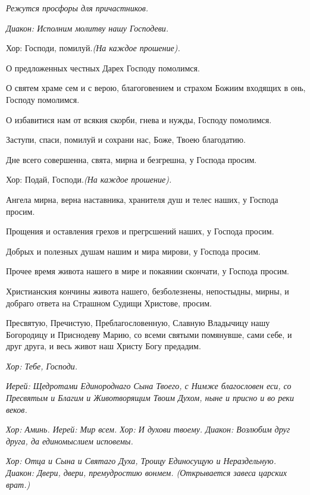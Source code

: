 \itshape  Режутся просфоры для причастников\normalfont{}. 




\itshape  Диакон:\normalfont{} Исполним молитву нашу Господеви. \itshape 


  Хор:\normalfont{} Господи, помилуй.\itshape  (На каждое прошение\normalfont{}). 


  О предложенных честных Дарех Господу помолимся. 


  О святем храме сем и с верою, благоговением и страхом Божиим входящих в онь, Господу помолимся. 


  О избавитися нам от всякия скорби, гнева и нужды, Господу помолимся. 


  Заступи, спаси, помилуй и сохрани нас, Боже, Твоею благодатию. 


  Дне всего совершенна, свята, мирна и безгрешна, у Господа просим. \itshape 


  Хор:\normalfont{} Подай, Господи.\itshape  (На каждое прошение)\normalfont{}. 


  Ангела мирна, верна наставника, хранителя душ и телес наших, у Господа просим. 


  Прощения и оставления грехов и прегрсшений наших, у Господа просим. 


  Добрых и полезных душам нашим и мира мирови, у Господа просим. 


  Прочее время живота нашего в мире и покаянии скончати, у Господа просим. 


  Христианския кончины живота нашего, безболезнены, непостыдны, мирны, и добраго ответа на Страшном Судищи Христове, просим. 


  Пресвятую, Пречистую, Преблагословенную, Славную Владычицу нашу Богородицу и Приснодеву Марию, со всеми святыми помянувше, сами себе, и друг друга, и весь живот наш Христу Богу предадим.


\itshape Хор:\normalfont{} Тебе, Господи.


\itshape Иерей:\normalfont{} Щедротами Единороднаго Сына Твоего, с Нимже благословен еси, со Пресвятым и Благим и Животворящим Твоим Духом, ныне и присно и во реки веков.


\itshape Хор:\normalfont{} Аминь. \itshape  Иерей:\normalfont{} Мир всем. \itshape  Хор:\normalfont{} И духови твоему. \itshape  Диакон:\normalfont{} Возлюбим друг друга, да единомыслием исповемы.


\itshape Хор:\normalfont{} Отца и Сына и Святаго Духа, Троицу Единосущую и Нераздельную. \itshape  Диакон:\normalfont{} Двери, двери, премудростию вонмем. \itshape  (Открывается завеса царских врат\normalfont{}.)

